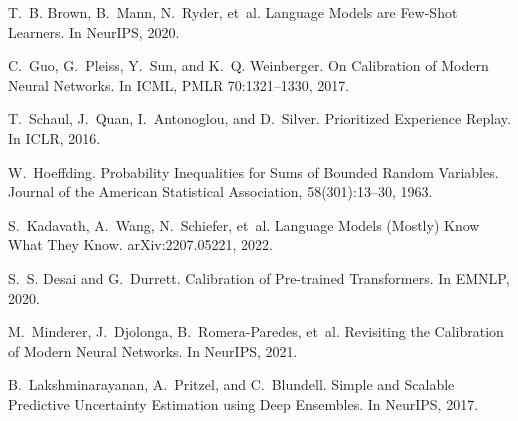 \documentclass[11pt]{article}
\begin{document}
\begin{thebibliography}{99}
T.~B. Brown, B.~Mann, N.~Ryder, et~al.
\newblock Language Models are Few-Shot Learners.
\newblock In NeurIPS, 2020.

C.~Guo, G.~Pleiss, Y.~Sun, and K.~Q. Weinberger.
\newblock On Calibration of Modern Neural Networks.
\newblock In ICML, PMLR 70:1321--1330, 2017.

T.~Schaul, J.~Quan, I.~Antonoglou, and D.~Silver.
\newblock Prioritized Experience Replay.
\newblock In ICLR, 2016.

W.~Hoeffding.
\newblock Probability Inequalities for Sums of Bounded Random Variables.
\newblock Journal of the American Statistical Association, 58(301):13--30, 1963.

S.~Kadavath, A.~Wang, N.~Schiefer, et~al.
\newblock Language Models (Mostly) Know What They Know.
\newblock arXiv:2207.05221, 2022.

S.~S. Desai and G.~Durrett.
\newblock Calibration of Pre-trained Transformers.
\newblock In EMNLP, 2020.

M.~Minderer, J.~Djolonga, B.~Romera-Paredes, et~al.
\newblock Revisiting the Calibration of Modern Neural Networks.
\newblock In NeurIPS, 2021.

B.~Lakshminarayanan, A.~Pritzel, and C.~Blundell.
\newblock Simple and Scalable Predictive Uncertainty Estimation using Deep Ensembles.
\newblock In NeurIPS, 2017.
\end{thebibliography}
\end{document}
